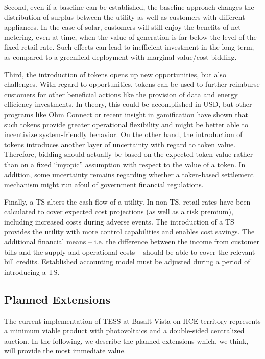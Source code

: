 Second, even if a baseline can be established, the baseline approach changes the distribution of surplus between the utility as well as customers with different appliances. In the case of solar, customers will still enjoy the benefits of net-metering, even at time, when the value of generation is far below the level of the fixed retail rate. Such effects can lead to inefficient investment in the long-term, as compared to a greenfield deployment with marginal value/cost bidding.

Third, the introduction of tokens opens up new opportunities, but also challenges. With regard to opportunities, tokens can be used to further reimburse customers for other beneficial actions like the provision of data and energy efficiency investments. In theory, this could be accomplished in USD, but other programs like Ohm Connect or recent insight in gamification have shown that such tokens provide greater operational flexibility and might be better able to incentivize system-friendly behavior.
On the other hand, the introduction of tokens introduces another layer of uncertainty with regard to token value. Therefore, bidding should actually be based on the expected token value rather than on a fixed ``myopic'' assumption with respect to the value of a token.
In addition, some uncertainty remains regarding whether a token-based settlement mechanism might run afoul of government financial regulations.

Finally, a TS alters the cash-flow of a utility. In non-TS, retail rates have been calculated to cover expected cost projections (as well as a risk premium), including increased costs during adverse events. The introduction of a TS provides the utility with more control capabilities and enables cost savings. The additional financial means -- i.e. the difference between the income from customer bills and the supply and operational costs -- should be able to cover the relevant bill credits. 
Established accounting model must be adjusted during a period of introducing a TS.

\subsection{Planned Extensions}\label{sec:extensions}

The current implementation of TESS at Basalt Vista on HCE territory represents a minimum viable product with photovoltaics and a double-sided centralized auction. In the following, we describe the planned extensions which, we think, will provide the most immediate value.


